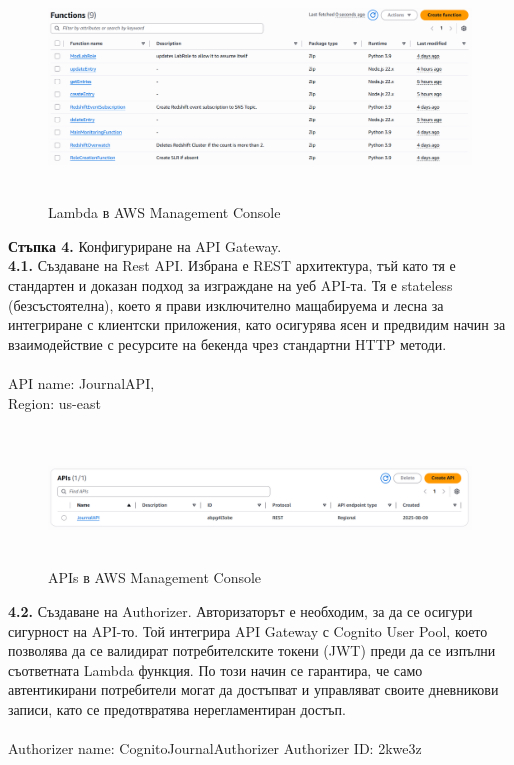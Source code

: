\documentclass[12pt]{article}
\begin{document}
 \begin{figure}[H]
\centering
    \includegraphics[scale=0.4]{lambda.png}
  \caption{Lambda в AWS Management Console}
\end{figure}

\medskip

\noindent\textbf{Стъпка 4.} Конфигуриране на API Gateway.\\
\noindent\textbf{4.1.} Създаване на Rest API. Избрана е REST архитектура, тъй като тя е стандартен и доказан подход за изграждане на уеб API-та. Тя е stateless (безсъстоятелна), което я прави изключително мащабируема и лесна за интегриране с клиентски приложения, като осигурява ясен и предвидим начин за взаимодействие с ресурсите на бекенда чрез стандартни HTTP методи.
\\
\\
API name: JournalAPI,\\
Region: us-east\\

 \begin{figure}[H]
\centering
    \includegraphics[scale=0.4]{api.png}
  \caption{APIs в AWS Management Console}
\end{figure}

\noindent\textbf{4.2.} Създаване на Authorizer. Авторизаторът е необходим, за да се осигури сигурност на API-то. Той интегрира API Gateway с Cognito User Pool, което позволява да се валидират потребителските токени (JWT) преди да се изпълни съответната Lambda функция. По този начин се гарантира, че само автентикирани потребители могат да достъпват и управляват своите дневникови записи, като се предотвратява нерегламентиран достъп.
\\
\\
Authorizer name: CognitoJournalAuthorizer
Authorizer ID: 2kwe3z
\end{document}
